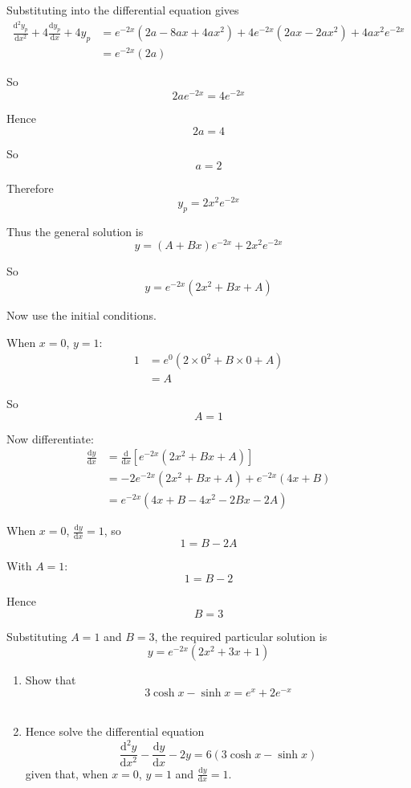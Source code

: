 \documentclass[leqno]{article}
\begin{document}
\begin{enumerate}[
  label=\textbf{\arabic*.},
  leftmargin=*,
  topsep=0pt,
  partopsep=0pt,
  parsep=0pt
]
\begin{djsSolution}
\begin{enumerate}[label=\textbf{(\alph*)}]
Substituting into the differential equation gives
\begin{align*}
\frac{\mathrm{d}^2y_p}{\mathrm{d}x^2}+4\frac{\mathrm{d}y_p}{\mathrm{d}x}+4y_p
&= e^{-2x}(2a-8ax+4ax^2)+4e^{-2x}(2ax-2ax^2)+4ax^2e^{-2x} \\
&= e^{-2x}(2a)
\end{align*}

So
\[
2ae^{-2x}=4e^{-2x}
\]

Hence
\[
2a=4
\]

So
\[
a=2
\]

Therefore
\[
y_p=2x^2e^{-2x}
\]

Thus the general solution is
\[
y=(A+Bx)e^{-2x}+2x^2e^{-2x}
\]

So
\[
y=e^{-2x}(2x^2+Bx+A)
\]

Now use the initial conditions.

When $x=0$, $y=1$:
\begin{align*}
1
&= e^{0}(2\times 0^2+B\times 0+A) \\
&= A
\end{align*}

So
\[
A=1
\]

Now differentiate:
\begin{align*}
\frac{\mathrm{d}y}{\mathrm{d}x}
&= \frac{\mathrm{d}}{\mathrm{d}x}\left[e^{-2x}(2x^2+Bx+A)\right] \\
&= -2e^{-2x}(2x^2+Bx+A)+e^{-2x}(4x+B) \\
&= e^{-2x}(4x+B-4x^2-2Bx-2A)
\end{align*}

When $x=0$, $\frac{\mathrm{d}y}{\mathrm{d}x}=1$, so
\[
1=B-2A
\]

With $A=1$:
\[
1=B-2
\]

Hence
\[
B=3
\]

Substituting $A=1$ and $B=3$, the required particular solution is
\[
y=e^{-2x}(2x^2+3x+1)
\]
\end{enumerate}
\end{djsSolution}


\newpage

\questionitem

\begin{enumerate}[label=\textbf{(\alph*)}]
  \item Show that \[3\cosh x - \sinh x = e^x + 2e^{-x}\]  \\
  \item Hence solve the differential equation
  \[
  \frac{\mathrm{d}^2 y}{\mathrm{d}x^2} - \frac{\mathrm{d}y}{\mathrm{d}x} - 2y = 6(3\cosh x - \sinh x)
  \]
  given that, when $x=0$, $y=1$ and $\frac{\mathrm{d}y}{\mathrm{d}x}=1$.  \\
\end{enumerate}


\end{enumerate}
\end{document}
